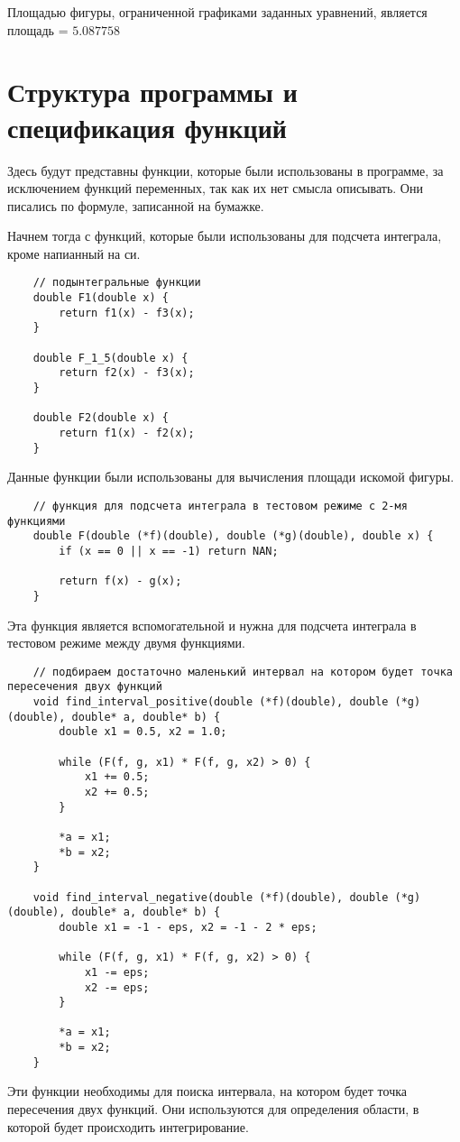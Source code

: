 \documentclass[a4paper,12pt,titlepage,finall]{article}
\begin{document}
Площадью фигуры, ограниченной графиками заданных уравнений, является площадь = $5.087758$

\newpage

\section{Структура программы и спецификация функций}
Здесь будут представны функции, которые были использованы в программе, за исключением функций переменных, так как их нет смысла описывать.
Они писались по формуле, записанной на бумажке.

Начнем тогда с функций, которые были использованы для подсчета интеграла, кроме напианный на си.
\begin{verbatim}
    // подынтегральные функции
    double F1(double x) {
        return f1(x) - f3(x);
    }

    double F_1_5(double x) {
        return f2(x) - f3(x);
    }

    double F2(double x) {
        return f1(x) - f2(x);
    }
\end{verbatim}
Данные функции были использованы для вычисления площади искомой фигуры.

\begin{verbatim}
    // функция для подсчета интеграла в тестовом режиме с 2-мя функциями
    double F(double (*f)(double), double (*g)(double), double x) {
        if (x == 0 || x == -1) return NAN;

        return f(x) - g(x);
    }
\end{verbatim}
Эта функция является вспомогательной и нужна для подсчета интеграла в тестовом режиме между двумя функциями.


\begin{verbatim}
    // подбираем достаточно маленький интервал на котором будет точка пересечения двух функций
    void find_interval_positive(double (*f)(double), double (*g)(double), double* a, double* b) {
        double x1 = 0.5, x2 = 1.0;

        while (F(f, g, x1) * F(f, g, x2) > 0) {
            x1 += 0.5;
            x2 += 0.5;
        }

        *a = x1;
        *b = x2;
    }

    void find_interval_negative(double (*f)(double), double (*g)(double), double* a, double* b) {
        double x1 = -1 - eps, x2 = -1 - 2 * eps;

        while (F(f, g, x1) * F(f, g, x2) > 0) {
            x1 -= eps;
            x2 -= eps;
        }

        *a = x1;
        *b = x2;
    }
\end{verbatim}
Эти функции необходимы для поиска интервала, на котором будет точка пересечения двух функций.
Они используются для определения области, в которой будет происходить интегрирование.
\end{document}
